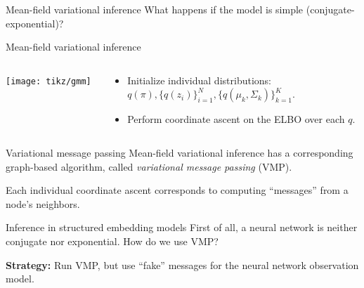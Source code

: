 \documentclass[10pt, compress]{beamer}
\begin{document}
\begin{frame}{Mean-field variational inference}
  \centering
  What happens if the model is simple (conjugate-exponential)? 
  
  \pause Mean-field variational inference
  
  \begin{columns}
    \begin{column}{0.3\textwidth}
      \texttt{[image: tikz/gmm]}
    \end{column}
    \begin{column}{0.5\textwidth}
        \begin{itemize}
            \item Initialize individual distributions: \\ $q(\pi), \{q(z_i)\}_{i = 1}^N,
            \{q(\mu_k, \Sigma_k)\}_{k = 1}^K$.
            \item Perform coordinate ascent on the ELBO over each $q$.
        \end{itemize}
    \end{column}
  \end{columns}
\end{frame}

\begin{frame}{Variational message passing}
  Mean-field variational inference has a corresponding
  graph-based algorithm, called \emph{variational message passing} (VMP).
  
  \pause
  
  Each individual coordinate ascent corresponds to
  computing ``messages'' from a node's neighbors.

  \begin{center}
  \end{center}

\end{frame}

\begin{frame}{Inference in structured embedding models}
  First of all, a neural network is neither conjugate nor exponential.
  How do we use VMP?

  \pause
  \textbf{Strategy:} Run VMP, but use ``fake'' messages for the neural network observation model.

  \begin{center}
  \end{center}

\end{frame}
\end{document}
